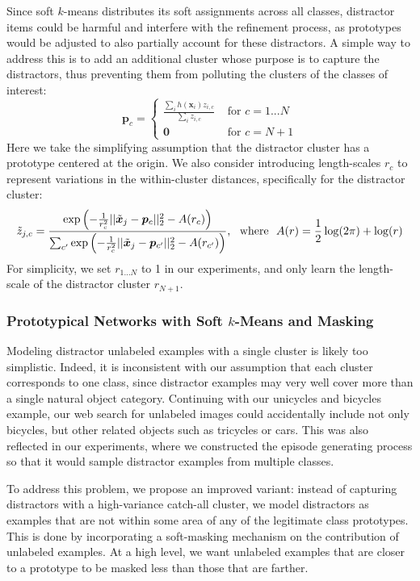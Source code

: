 Since soft $k$-means distributes its soft assignments across all classes, distractor items could be
harmful and interfere with the refinement process, as prototypes would be adjusted to also partially
account for these distractors. A simple way to address this is to add an additional cluster whose
purpose is to capture the distractors, thus preventing them from polluting the clusters of the
classes of interest:
\begin{equation}
    \bm{p}_c =
    \begin{cases}
        \frac{\sum_i h(\bm{x}_i) z_{i,c}}{\sum_i z_{i,c}} & \text{\ \ for\ \ } c = 1...N\\
        \bm{0} & \text{\ \ for\ \ } c = N+1
    \end{cases}
\end{equation}
Here we take the simplifying assumption that the distractor cluster has a prototype centered at the
origin.  We also consider introducing length-scales $r_c$ to represent variations in the 
within-cluster distances, specifically for the distractor cluster:
\begin{align}
    \tilde{z}_{j,c} = \frac{\exp \left(-\frac{1}{r_c^2}||\tilde{\bm{x}}_j - \bm{p}_c||^2_2 -A(r_c) \right)}
    {\sum_{c'} \exp \left(-\frac{1}{r_c^2}||\tilde{\bm{x}}_j - \bm{p}_{c'}||^2_2 -A(r_{c'}) \right) }, ~~{\rm where}~~
    A(r) = \frac{1}{2}\log(2\pi) + \log(r)
\end{align}
For simplicity, we set $r_{1\dots N}$ to 1 in our experiments, and only learn the
length-scale of the distractor cluster $r_{N+1}$.

\subsubsection{Prototypical Networks with Soft $k$-Means and Masking}
Modeling distractor unlabeled examples with a single  cluster is likely too simplistic. Indeed, it
is inconsistent with our assumption that each cluster corresponds to one class, since distractor
examples may very well cover more than a single natural object category.  Continuing with our
unicycles and bicycles example, our web search for unlabeled images could accidentally include not
only bicycles, but other related objects such as tricycles or cars.   This was also reflected in our
experiments, where we constructed the episode generating process so that it would sample distractor
examples from multiple classes.

To address this problem, we propose an improved variant: instead of capturing distractors with a
high-variance catch-all cluster, we model distractors as examples that are not within some area of
any of the legitimate class prototypes. This is done by incorporating a soft-masking mechanism on
the contribution of unlabeled examples. At a high level, we want unlabeled examples that are closer
to a prototype to be masked less than those that are farther.

